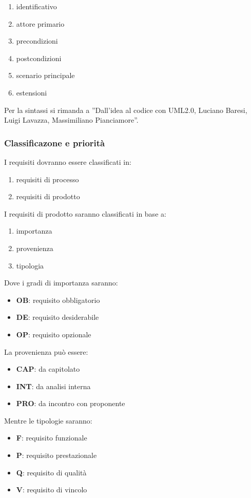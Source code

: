 {{{			\begin{enumerate}
				\item identificativo
				\item attore primario
				\item precondizioni
				\item postcondizioni
				\item scenario principale
				\item estensioni
			\end{enumerate}
			Per la sintassi si rimanda a ”Dall’idea al codice con UML2.0, Luciano Baresi, Luigi Lavazza, Massimiliano Pianciamore”.
			}
			\subsubsection{Classificazone e priorità}{
				I requisiti dovranno essere classificati in:
				\begin{enumerate}
					\item requisiti di processo
					\item requisiti di prodotto
				\end{enumerate}
				I requisiti di prodotto saranno classificati in base a:
				\begin{enumerate}
					\item importanza
					\item provenienza
					\item tipologia
				\end{enumerate}
				Dove i gradi di importanza saranno:
				\begin{itemize}
						\item \textbf{OB}: requisito obbligatorio
						\item \textbf{DE}: requisito desiderabile
						\item \textbf{OP}: requisito opzionale
				\end{itemize}
				La provenienza può essere:
				\begin{itemize}
					\item \textbf{CAP}: da capitolato
					\item \textbf{INT}: da analisi interna
					\item \textbf{PRO}: da incontro con proponente
				\end{itemize}
				Mentre le tipologie saranno:
				\begin{itemize}
					\item \textbf{F}: requisito funzionale
					\item \textbf{P}: requisito prestazionale
					\item \textbf{Q}: requisito di qualità
					\item \textbf{V}: requisito di vincolo
				\end{itemize}
			}
}}
